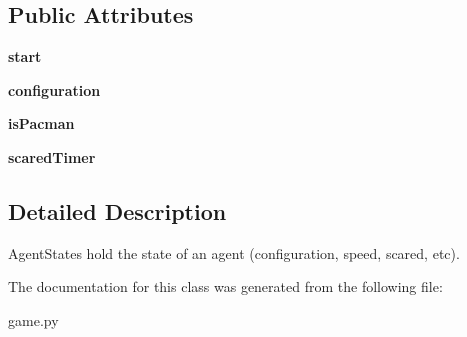 \subsection*{Public Attributes}
\begin{DoxyCompactItemize}
\item 
\mbox{\label{classgame_1_1_agent_state_aababfd569db2af85389b4ed54ad114f4}} 
{\bfseries start}
\item 
\mbox{\label{classgame_1_1_agent_state_a39c0db462c50b0485549a14816ab438d}} 
{\bfseries configuration}
\item 
\mbox{\label{classgame_1_1_agent_state_aed55d1014e05b62c652a484a3bb6416c}} 
{\bfseries is\+Pacman}
\item 
\mbox{\label{classgame_1_1_agent_state_ab28305007f9be94841f7d0c938ab9d8c}} 
{\bfseries scared\+Timer}
\end{DoxyCompactItemize}


\subsection{Detailed Description}
\begin{DoxyVerb}AgentStates hold the state of an agent (configuration, speed, scared, etc).
\end{DoxyVerb}
 

The documentation for this class was generated from the following file\+:\begin{DoxyCompactItemize}
\item 
game.\+py\end{DoxyCompactItemize}
